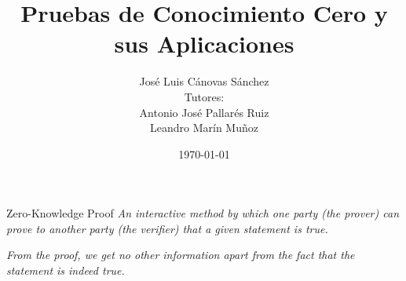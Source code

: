 \documentclass{beamer}
\title{Pruebas de Conocimiento Cero y sus Aplicaciones}
\date{\today}
\author{José Luis Cánovas Sánchez\\[3mm]\scriptsize Tutores:\\Antonio José Pallarés Ruiz\\Leandro Marín Muñoz}
\institute{Universidad de Murcia\\Facultad de Matemáticas}
\begin{document}
\maketitle




\begin{frame}[t]{Zero-Knowledge Proof}
	\textit{An interactive method by which one party (the prover) can prove to another party (the verifier) that a given statement is true.}
		
	\textit{From the proof, we get no other information apart from the fact that the statement is indeed true.}
	
	\hfil
	

\end{frame}
\end{document}
